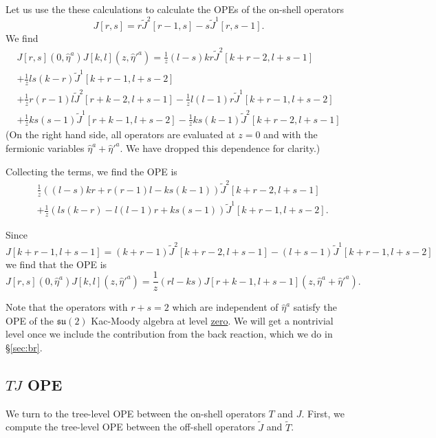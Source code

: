 \documentclass[11pt]{amsart}
\newcommand{\what}{\widehat}
\newcommand{\til}{\widetilde}
\newcommand{\mf}{\mathfrak}
\theoremstyle{thm}
\numberwithin{equation}{subsection}
\theoremstyle{def}
\theoremstyle{rem}
\begin{document}
Let us use the these calculations to calculate the OPEs of the on-shell operators 
\[ 
	 	J[r,s] = r \til{J}^2[r-1,s] - s \til{J}^1[r,s-1]. 
\]
We find
\begin{multline}
	J[r,s] (0,\what{\eta}^a) J[k,l](z,\what{\eta}'^{a}) =   \frac{1}{z} (l-s) k r  \til{J}^2 [k+r-2,l+s-1]   \\
	+ \frac{1}{z} ls(k-r) \til{J}^1[k+r-1, l+s-2] \\
	+  \frac{1}{z} r (r-1) l  \til{J}^2[r+k-2, l+s -1 ]    - \frac{1}{z} l (l-1) r \til{J}^1[k+r-1,l+s-2]  \\
	+ \frac{1}{z} k s(s-1)  \til{J}^1[r+k-1, l+s - 2]    - \frac{1}{z}k s  (k-1) \til{J}^2[k+r-2,l+s-1] 
\end{multline}
(On the right hand side, all operators are evaluated at $z = 0$ and with the fermionic variables $\what{\eta}^a+\what{\eta}'^{a}$.  We have dropped this dependence for clarity.)

Collecting the terms, we find the OPE is
\begin{align*} 
	&\frac{1}{z} \left( (l-s)kr + r (r-1) l - ks (k-1)     \right)  \til{J}^2 [k+r - 2, l +s - 1]  \\
	&+ \frac{1}{z} \left( ls (k-r) - l (l-1) r + k s (s-1)  \right) \til{J}^1 [ k + r -1, l + s - 2]. 
\end{align*}

Since 
\[ 
	 J[k+r-1,l+s-1] = (k+r-1)\til{J}^2 [k+r-2,l+s-1] - (l+s-1) \til{J}^1 [ k+r - 1, l +s - 2] 
\]
we find that the OPE is 
\[ 
	J[r,s](0,\what{\eta}^a)J[k,l](z,\what{\eta}'^{a}) = \frac{1}{z} (rl-ks)  J[r+k-1,l+s-1](z, \what{\eta}^a + \what{\eta}'^{a}).     
\]

Note that the operators with $r + s = 2$ which are independent of $\what{\eta}^a$ satisfy the OPE of the $\mf{su}(2)$ Kac-Moody algebra at level \underline{zero}.
We will get a nontrivial level once we include the contribution from the back reaction, which we do in \S \ref{sec:br}. 

\subsection{$TJ$ OPE}

We turn to the tree-level OPE between the on-shell operators $T$ and $J$. 
First, we compute the tree-level OPE between the off-shell operators $\til{J}$ and $\til{T}$. 
\end{document}

